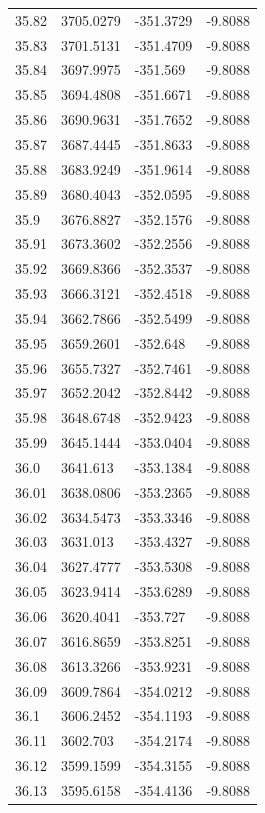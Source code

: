 \begin{table}[H]
\begin{tabular}{llll}
35.82 & 3705.0279 & -351.3729 & -9.8088 \\
35.83 & 3701.5131 & -351.4709 & -9.8088 \\
35.84 & 3697.9975 & -351.569 & -9.8088 \\
35.85 & 3694.4808 & -351.6671 & -9.8088 \\
35.86 & 3690.9631 & -351.7652 & -9.8088 \\
35.87 & 3687.4445 & -351.8633 & -9.8088 \\
35.88 & 3683.9249 & -351.9614 & -9.8088 \\
35.89 & 3680.4043 & -352.0595 & -9.8088 \\
35.9 & 3676.8827 & -352.1576 & -9.8088 \\
35.91 & 3673.3602 & -352.2556 & -9.8088 \\
35.92 & 3669.8366 & -352.3537 & -9.8088 \\
35.93 & 3666.3121 & -352.4518 & -9.8088 \\
35.94 & 3662.7866 & -352.5499 & -9.8088 \\
35.95 & 3659.2601 & -352.648 & -9.8088 \\
35.96 & 3655.7327 & -352.7461 & -9.8088 \\
35.97 & 3652.2042 & -352.8442 & -9.8088 \\
35.98 & 3648.6748 & -352.9423 & -9.8088 \\
35.99 & 3645.1444 & -353.0404 & -9.8088 \\
36.0 & 3641.613 & -353.1384 & -9.8088 \\
36.01 & 3638.0806 & -353.2365 & -9.8088 \\
36.02 & 3634.5473 & -353.3346 & -9.8088 \\
36.03 & 3631.013 & -353.4327 & -9.8088 \\
36.04 & 3627.4777 & -353.5308 & -9.8088 \\
36.05 & 3623.9414 & -353.6289 & -9.8088 \\
36.06 & 3620.4041 & -353.727 & -9.8088 \\
36.07 & 3616.8659 & -353.8251 & -9.8088 \\
36.08 & 3613.3266 & -353.9231 & -9.8088 \\
36.09 & 3609.7864 & -354.0212 & -9.8088 \\
36.1 & 3606.2452 & -354.1193 & -9.8088 \\
36.11 & 3602.703 & -354.2174 & -9.8088 \\
36.12 & 3599.1599 & -354.3155 & -9.8088 \\
36.13 & 3595.6158 & -354.4136 & -9.8088 \\

\end{tabular}
\end{table}
